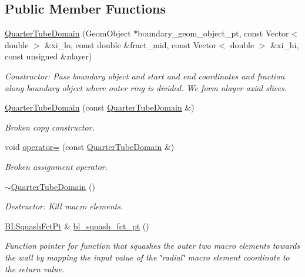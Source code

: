 \subsection*{Public Member Functions}
\begin{DoxyCompactItemize}
\item 
\hyperlink{classoomph_1_1QuarterTubeDomain_a51cea676b1cdf56cc3f1ff5fbec952f8}{Quarter\+Tube\+Domain} (Geom\+Object $\ast$boundary\+\_\+geom\+\_\+object\+\_\+pt, const Vector$<$ double $>$ \&xi\+\_\+lo, const double \&fract\+\_\+mid, const Vector$<$ double $>$ \&xi\+\_\+hi, const unsigned \&nlayer)
\begin{DoxyCompactList}\small\item\em Constructor\+: Pass boundary object and start and end coordinates and fraction along boundary object where outer ring is divided. We form nlayer axial slices. \end{DoxyCompactList}\item 
\hyperlink{classoomph_1_1QuarterTubeDomain_a3784528b5fb419be94556912166975f8}{Quarter\+Tube\+Domain} (const \hyperlink{classoomph_1_1QuarterTubeDomain}{Quarter\+Tube\+Domain} \&)
\begin{DoxyCompactList}\small\item\em Broken copy constructor. \end{DoxyCompactList}\item 
void \hyperlink{classoomph_1_1QuarterTubeDomain_aad4f59dfaa325e7d8a67ed477114700b}{operator=} (const \hyperlink{classoomph_1_1QuarterTubeDomain}{Quarter\+Tube\+Domain} \&)
\begin{DoxyCompactList}\small\item\em Broken assignment operator. \end{DoxyCompactList}\item 
\hyperlink{classoomph_1_1QuarterTubeDomain_a191be8daa569473cebcc1466d8235175}{$\sim$\+Quarter\+Tube\+Domain} ()
\begin{DoxyCompactList}\small\item\em Destructor\+: Kill macro elements. \end{DoxyCompactList}\item 
\hyperlink{classoomph_1_1QuarterTubeDomain_a3d8c15c17d9912d8c519c028437c0b2c}{B\+L\+Squash\+Fct\+Pt} \& \hyperlink{classoomph_1_1QuarterTubeDomain_a11251924a7d83e09208138b3bedba160}{bl\+\_\+squash\+\_\+fct\+\_\+pt} ()
\begin{DoxyCompactList}\small\item\em Function pointer for function that squashes the outer two macro elements towards the wall by mapping the input value of the \char`\"{}radial\char`\"{} macro element coordinate to the return value. \end{DoxyCompactList}\item 

\end{DoxyCompactItemize}
